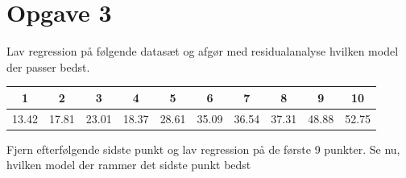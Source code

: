 \section*{Opgave 3}
Lav regression på følgende datasæt og afgør med residualanalyse hvilken model der passer bedst.
\begin{center}
\begin{tabular}{c|c|c|c|c|c|c|c|c|c}
1 & 2 & 3 & 4 & 5 & 6 & 7 & 8 & 9 & 10\\ \hline
13.42& 17.81& 23.01& 18.37& 28.61& 35.09&
 36.54 &37.31& 48.88& 52.75
\end{tabular}
\end{center}
Fjern efterfølgende sidste punkt og lav regression på de første 9 punkter. Se nu, hvilken model der rammer det sidste punkt bedst